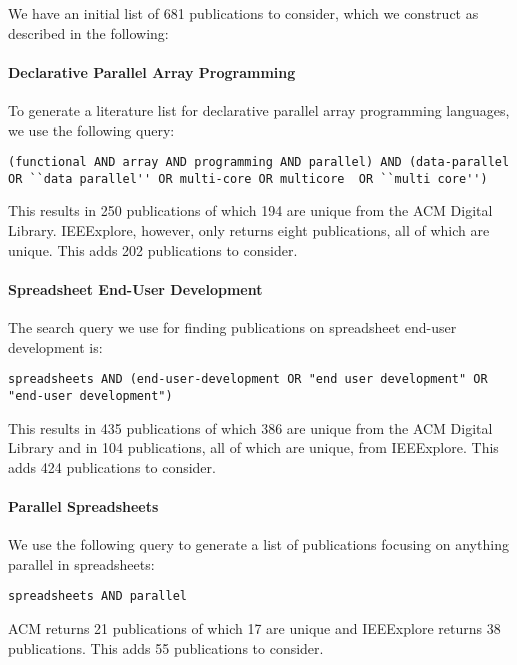 \documentclass[a4paper]{article}
\begin{document}
We have an initial list of 681 publications to consider, which we
construct as described in the following:

\paragraph{Declarative Parallel Array Programming}

To generate a literature list for declarative parallel array
programming languages, we use the following query:

\begin{lstlisting}
(functional AND array AND programming AND parallel) AND (data-parallel OR ``data parallel'' OR multi-core OR multicore  OR ``multi core'')
\end{lstlisting}

\noindent This results in 250 publications of which 194 are unique from the ACM
Digital Library. IEEExplore, however, only returns eight publications,
all of which are unique. This adds 202 publications to consider.

\paragraph{Spreadsheet End-User Development}

The search query we use for finding publications on spreadsheet
end-user development is:

\begin{lstlisting}
spreadsheets AND (end-user-development OR "end user development" OR "end-user development")
\end{lstlisting}

\noindent This results in 435 publications of which 386 are unique from the ACM
Digital Library and in 104 publications, all of which are unique, from
IEEExplore. This adds 424 publications to consider.

\paragraph{Parallel Spreadsheets}

We use the following query to generate a list of publications focusing
on anything parallel in spreadsheets:

\begin{lstlisting}
spreadsheets AND parallel
\end{lstlisting}

\noindent ACM returns 21 publications of which 17 are unique and
IEEExplore returns 38 publications. This adds 55 publications to
consider.
\end{document}
